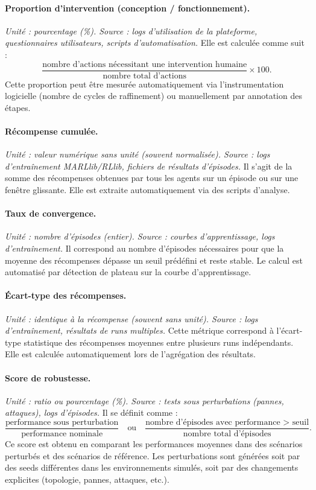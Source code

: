 \paragraph{Proportion d’intervention (conception / fonctionnement).}
\textit{Unité : pourcentage (\%). Source : logs d’utilisation de la plateforme, questionnaires utilisateurs, scripts d’automatisation.}
Elle est calculée comme suit :
\[
  \frac{\text{nombre d’actions nécessitant une intervention humaine}}{\text{nombre total d’actions}} \times 100.
\]
Cette proportion peut être mesurée automatiquement via l’instrumentation logicielle (nombre de cycles de raffinement) ou manuellement par annotation des étapes.

\paragraph{Récompense cumulée.}
\textit{Unité : valeur numérique sans unité (souvent normalisée). Source : logs d’entraînement MARLlib/RLlib, fichiers de résultats d’épisodes.}
Il s’agit de la somme des récompenses obtenues par tous les agents sur un épisode ou sur une fenêtre glissante.
Elle est extraite automatiquement via des scripts d’analyse.

\paragraph{Taux de convergence.}
\textit{Unité : nombre d’épisodes (entier). Source : courbes d’apprentissage, logs d’entraînement.}
Il correspond au nombre d’épisodes nécessaires pour que la moyenne des récompenses dépasse un seuil prédéfini et reste stable.
Le calcul est automatisé par détection de plateau sur la courbe d’apprentissage.

\paragraph{Écart-type des récompenses.}
\textit{Unité : identique à la récompense (souvent sans unité). Source : logs d’entraînement, résultats de runs multiples.}
Cette métrique correspond à l’écart-type statistique des récompenses moyennes entre plusieurs runs indépendants.
Elle est calculée automatiquement lors de l’agrégation des résultats.

\paragraph{Score de robustesse.}
\textit{Unité : ratio ou pourcentage (\%). Source : tests sous perturbations (pannes, attaques), logs d’épisodes.}
Il se définit comme :
\[
  \frac{\text{performance sous perturbation}}{\text{performance nominale}}
  \quad \text{ou} \quad
  \frac{\text{nombre d’épisodes avec performance > seuil}}{\text{nombre total d’épisodes}}.
\]
Ce score est obtenu en comparant les performances moyennes dans des scénarios perturbés et des scénarios de référence.
Les perturbations sont générées soit par des seeds différentes dans les environnements simulés, soit par des changements explicites (topologie, pannes, attaques, etc.).

